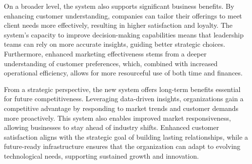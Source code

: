 On a broader level, the system also supports significant business benefits. By enhancing customer
understanding, companies can tailor their offerings to meet client needs more effectively, resulting
in higher satisfaction and loyalty. The system's capacity to improve decision-making capabilities
means that leadership teams can rely on more accurate insights, guiding better strategic choices.
Furthermore, enhanced marketing effectiveness stems from a deeper understanding of customer
preferences, which, combined with increased operational efficiency, allows for more resourceful use
of both time and finances.

From a strategic perspective, the new system offers long-term benefits essential for future
competitiveness. Leveraging data-driven insights, organizations gain a competitive advantage by
responding to market trends and customer demands more proactively. This system also enables improved
market responsiveness, allowing businesses to stay ahead of industry shifts. Enhanced customer
satisfaction aligns with the strategic goal of building lasting relationships, while a future-ready
infrastructure ensures that the organization can adapt to evolving technological needs, supporting
sustained growth and innovation.
